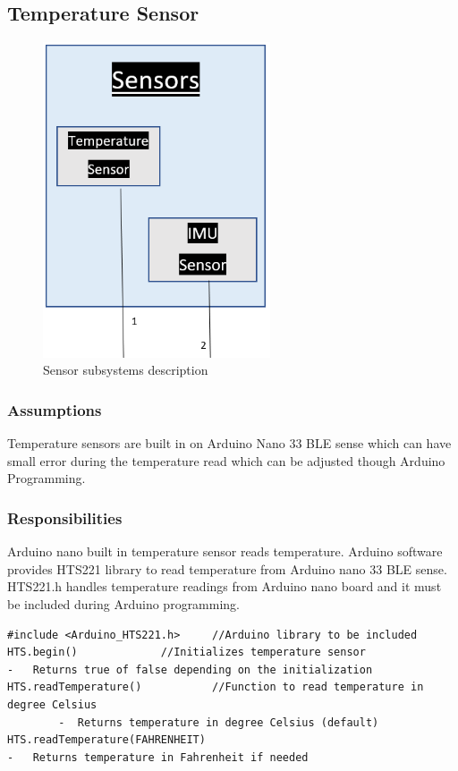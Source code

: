 \subsection{Temperature Sensor}
\begin{figure}[h!]
	\centering
 	\includegraphics[width=0.60\textwidth]{images/Sensors subsystems}
 \caption{Sensor subsystems description}
\end{figure}

\subsubsection{Assumptions}
Temperature sensors are built in on Arduino Nano 33 BLE sense which can have small error during the temperature read which can be adjusted though Arduino Programming.

\subsubsection{Responsibilities}
Arduino nano built in temperature sensor reads temperature. Arduino software provides HTS221 library to read temperature from Arduino nano 33 BLE sense. HTS221.h handles temperature readings from Arduino nano board and it must be included during Arduino programming.
\newpage
\begin{lstlisting}
#include <Arduino_HTS221.h>		//Arduino library to be included
HTS.begin()				//Initializes temperature sensor 
-	Returns true of false depending on the initialization
HTS.readTemperature()			//Function to read temperature in degree Celsius
        -  Returns temperature in degree Celsius (default)
HTS.readTemperature(FAHRENHEIT)
-	Returns temperature in Fahrenheit if needed
\end{lstlisting}

